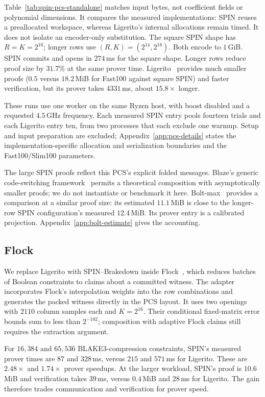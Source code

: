 Table~\ref{tab:spin-pcs-standalone} matches input bytes, not coefficient
fields or polynomial dimensions. It compares the measured implementations:
SPIN reuses a preallocated workspace, whereas Ligerito's internal
allocations remain timed. It does not isolate an encoder-only substitution.
The square SPIN shape has $R=K=2^{16}$; longer rows use
$(R,K)=(2^{14},2^{18})$. Both encode to $1$\,GiB.
SPIN commits and opens in $274$\,ms for the square shape.
Longer rows reduce proof size by $31.7\%$ at the same prover time.
Ligerito~\cite{ligerito25} provides much smaller proofs ($0.5$ versus
$18.2$\,MiB for Fast100 against square SPIN) and faster verification,
but its prover takes $4331$\,ms, about $15.8\times$ longer.

These runs use one worker on the same Ryzen host, with boost disabled
and a requested $4.5$\,GHz frequency. Each measured SPIN entry pools fourteen
trials and each Ligerito entry ten, from two processes that each exclude one warmup. Setup and input preparation
are excluded; Appendix~\ref{app:pcs-details} states the implementation-specific
allocation and serialization boundaries and the Fast100/Slim100 parameters.

The large SPIN proofs reflect this PCS's explicit folded messages.
Blaze's generic code-switching framework~\cite{blaze25} permits a theoretical
composition with asymptotically smaller proofs; we do not instantiate or
benchmark it here. Bolt-max~\cite{bolt26} provides a comparison at a
similar proof size: its estimated $11.1$\,MiB is close to the longer-row
SPIN configuration's measured $12.4$\,MiB. Its prover entry is a calibrated
projection.
Appendix~\ref{app:bolt-estimate} gives the accounting.

\subsection{Flock}
\label{sec:spin-flock}

We replace Ligerito with SPIN--Brakedown inside Flock~\cite{flock26},
which reduces batches of Boolean constraints to claims about a committed
witness. The adapter incorporates Flock's interpolation weights into the
row combinations and generates the packed witness directly in the PCS layout.
It uses two openings with $2110$ column samples each and $K=2^{16}$.
Their conditional fixed-matrix error bounds sum to less than $2^{-102}$;
composition with adaptive Flock claims still requires the extraction argument.

For $16{,}384$ and $65{,}536$ BLAKE3-compression constraints, SPIN's measured
prover times are $87$ and $328$\,ms, versus $215$ and $571$\,ms for Ligerito.
These are $2.48\times$ and $1.74\times$ prover speedups.
At the larger workload, SPIN's proof is $10.6$\,MiB and verification takes
$39$\,ms, versus $0.4$\,MiB and $28$\,ms for Ligerito.
The gain therefore trades communication and verification for prover speed.

